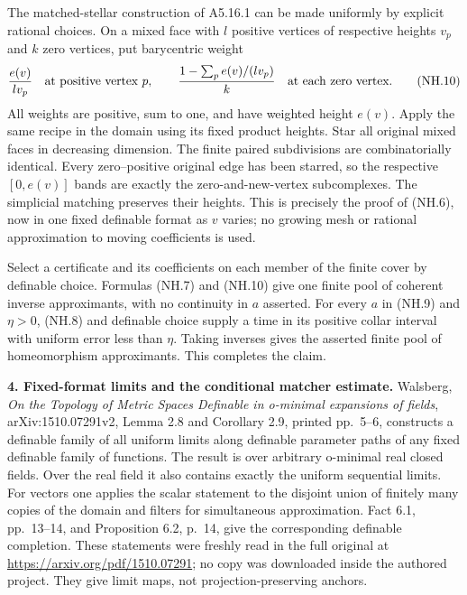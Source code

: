 The matched-stellar construction of A5.16.1 can be made uniformly by
explicit rational choices. On a mixed face with $l$ positive vertices
of respective heights $v_p$ and $k$ zero vertices, put barycentric weight
\[
 \frac{e(v)}{l v_p}\quad\hbox{at positive vertex }p,
 \qquad
 \frac{1-\sum_p e(v)/(l v_p)}{k}
       \quad\hbox{at each zero vertex}.                         \tag{NH.10}
\]
All weights are positive, sum to one, and have weighted height $e(v)$.
Apply the same recipe in the domain using its fixed product heights.
Star all original mixed faces in decreasing dimension. The finite paired
subdivisions are combinatorially identical. Every zero--positive original
edge has been starred, so the respective $[0,e(v)]$ bands are exactly
the zero-and-new-vertex subcomplexes. The simplicial matching preserves
their heights. This is precisely the proof of (NH.6), now in one fixed
definable format as $v$ varies; no growing mesh or rational approximation
to moving coefficients is used.

Select a certificate and its coefficients on each member of the finite
cover by definable choice. Formulas (NH.7) and (NH.10) give one finite
pool of coherent inverse approximants, with no continuity in $a$ asserted.
For every $a$ in (NH.9) and $\eta>0$, (NH.8) and definable choice supply
a time in its positive collar interval with uniform error less than
$\eta$. Taking inverses gives the asserted finite pool of homeomorphism
approximants. This completes the claim.

\textbf{4. Fixed-format limits and the conditional matcher estimate.}
Walsberg, \emph{On the Topology of Metric Spaces Definable in o-minimal
expansions of fields}, arXiv:1510.07291v2, Lemma 2.8 and Corollary 2.9,
printed pp.~5--6, constructs a definable family of all uniform limits
along definable parameter paths of any fixed definable family of functions.
The result is over arbitrary o-minimal real closed fields. Over the real
field it also contains exactly the uniform sequential limits. For vectors
one applies the scalar statement to the disjoint union of finitely many
copies of the domain and filters for simultaneous approximation. Fact 6.1,
pp.~13--14, and Proposition 6.2, p.~14, give the corresponding definable
completion. These statements were freshly read in the full original at
\url{https://arxiv.org/pdf/1510.07291}; no copy was downloaded inside the
authored project. They give limit maps, not projection-preserving anchors.

